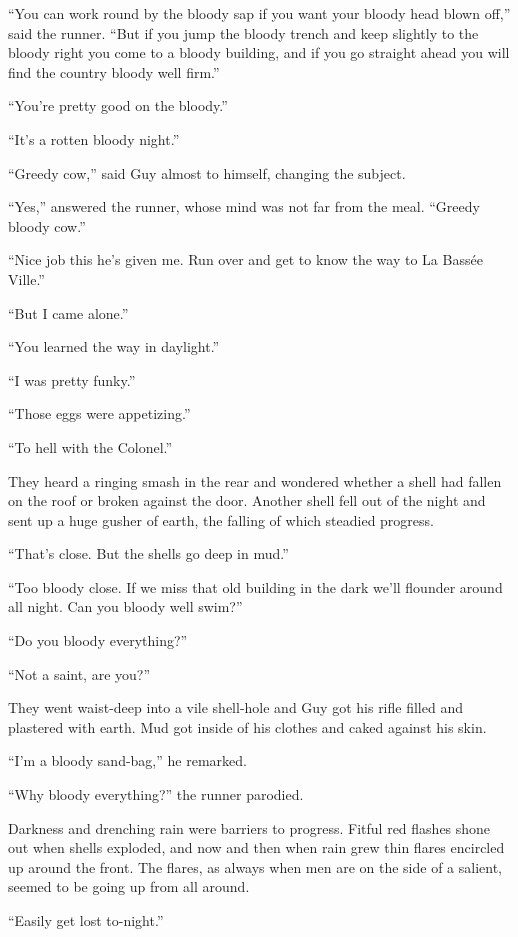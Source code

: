 ``You can work round by the bloody sap if you want your bloody head blown off,'' said the runner. ``But if you jump the bloody trench and keep slightly to the bloody right you come to a bloody building, and if you go straight ahead you will find the country bloody well firm.''

``You're pretty good on the bloody.''

``It's a rotten bloody night.''

``Greedy cow,'' said Guy almost to himself, changing the subject.

``Yes,'' answered the runner, whose mind was not far from the meal. ``Greedy bloody cow.''

``Nice job this he's given me. Run over and get to know the way to La Bass\'{e}e Ville.''

``But I came alone.''

``You learned the way in daylight.''

``I was pretty funky.''

``Those eggs were appetizing.''

``To hell with the Colonel.''

They heard a ringing smash in the rear and wondered whether a shell had fallen on the roof or broken against the door. Another shell fell out of the night and sent up a huge gusher of earth, the falling of which steadied progress.

``That's close. But the shells go deep in mud.''

``Too bloody close. If we miss that old building in the dark we'll flounder around all night. Can you bloody well swim?''

``Do you bloody everything?''

``Not a saint, are you?''

They went waist-deep into a vile shell-hole and Guy got his rifle filled and plastered with earth. Mud got inside of his clothes and caked against his skin.

``I'm a bloody sand-bag,'' he remarked.

``Why bloody everything?'' the runner parodied.

Darkness and drenching rain were barriers to progress. Fitful red flashes shone out when shells exploded, and now and then when rain grew thin flares encircled up around the front. The flares, as always when men are on the side of a salient, seemed to be going up from all around.

``Easily get lost to-night.''

